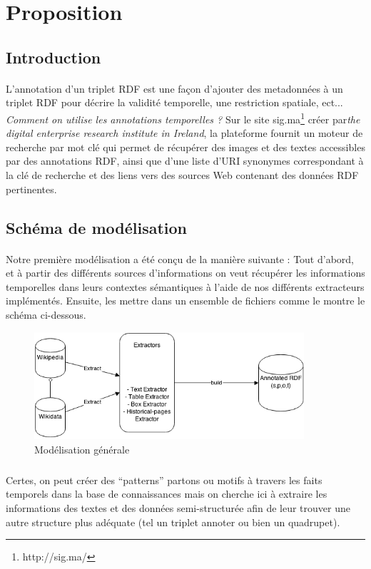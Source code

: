 \section*{Proposition}
\subsection*{Introduction}
\paragraph{}
L'annotation d'un triplet RDF est une façon d'ajouter des metadonnées à un triplet RDF pour décrire la validité temporelle, une restriction spatiale, ect...
\newline
\textit{Comment on utilise les annotations temporelles ?}
Sur le site sig.ma\footnote{http://sig.ma/} créer par\textit{the digital enterprise research institute in Ireland}, la plateforme fournit un moteur de recherche par mot clé qui permet de récupérer des images et des textes accessibles par des annotations RDF, ainsi que d'une liste d'URI synonymes correspondant à la clé de recherche et des liens vers des sources Web contenant des données RDF pertinentes.
\subsection*{Schéma de modélisation}
\paragraph{}
Notre première modélisation a été conçu de la manière suivante :
\newline
Tout d’abord, et à partir des différents sources d’informations on veut récupérer les informations temporelles dans leurs contextes sémantiques à l’aide de nos différents extracteurs implémentés. 
Ensuite, les mettre dans un ensemble de fichiers comme le montre le schéma ci-dessous.
\begin{figure}[H]
        \centering
                \centering
                \includegraphics[width=10cm]{modelisation.png}
               \caption{Modélisation générale}

\end{figure}
\subparagraph{}
Certes, on peut créer des “patterns” partons ou motifs à travers les faits temporels dans la base de connaissances mais on cherche ici à extraire les informations des textes et des données semi-structurée afin de leur trouver une autre structure plus adéquate (tel un triplet annoter ou bien un quadrupet).
